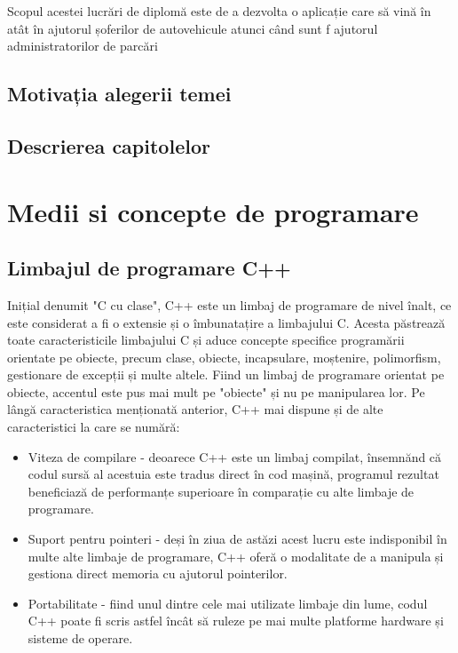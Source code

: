 \documentclass[12pt]{article}
\begin{document}
Scopul acestei lucr\u{a}ri de diplom\u{a} este de a dezvolta o aplicație care s\u{a} vin\u{a} \^{i}n at\^{a}t \^{i}n ajutorul șoferilor de autovehicule atunci c\^{a}nd sunt f ajutorul administratorilor de parc\u{a}ri 


\subsection{Motivația alegerii temei}

\subsection{Descrierea capitolelor}

\newpage

\section{Medii si concepte de programare}

\subsection{Limbajul de programare C++}

Inițial denumit "C cu clase", C++ este un limbaj de programare de nivel \^{i}nalt, ce este considerat a fi o extensie și o \^{i}mbunatațire a limbajului C. Acesta p\u{a}streaz\u{a} toate caracteristicile limbajului C și aduce concepte specifice program\u{a}rii orientate pe obiecte, precum clase, obiecte, incapsulare, moștenire, polimorfism, gestionare de excepții și multe altele. Fiind un limbaj de programare orientat pe obiecte, accentul este pus mai mult pe "obiecte" și nu pe manipularea lor. Pe l\^{a}ng\u{a} caracteristica menționat\u{a} anterior, C++ mai dispune și de alte caracteristici la care se num\u{a}r\u{a}: 

\begin{itemize}
    \item Viteza de compilare - deoarece C++ este un limbaj compilat, \^{i}nsemn\u{a}nd c\u{a} codul surs\u{a} al acestuia este tradus direct \^{i}n cod mașin\u{a}, programul rezultat beneficiaz\u{a} de performanțe superioare \^{i}n comparație cu alte limbaje de programare.
    \item Suport pentru pointeri - deși \^{i}n ziua de ast\u{a}zi acest lucru este indisponibil \^{i}n multe alte limbaje de programare, C++ ofer\u{a} o modalitate de a manipula și gestiona direct memoria cu ajutorul pointerilor.
    \item Portabilitate - fiind unul dintre cele mai utilizate limbaje din lume, codul C++ poate fi scris astfel \^{i}nc\^{a}t s\u{a} ruleze pe mai multe platforme hardware și sisteme de operare.
    
\end{itemize}
\end{document}
